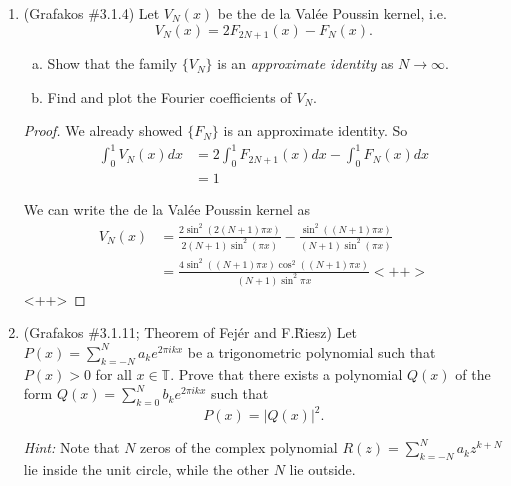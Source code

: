 \documentclass[a4paper]{article}
\begin{document}
\begin{enumerate}
\item  (Grafakos \#3.1.4) Let $V_N (x)$ be the de la Val\'{e}e Poussin   kernel, i.e. $$ V_N (x) = 2 F_{2N+1} (x) - F_N (x). $$

\begin{enumerate}[(a)]
\item Show that the family $\{ V_N \}$ is an {\it{approximate identity}} as $N\rightarrow \infty$.
\item Find and plot the Fourier coefficients of $V_N$.
\end{enumerate}

  \begin{proof}

    We already showed $\{F_N\}$ is an approximate identity. So
    \begin{align*}
      \int_{0}^{1} V_N(x) dx &= 2 \int_{0}^{1} F_{2N+1}(x) dx - \int_{0}^{1} F_N(x)dx \\
      &= 1
    \end{align*}

    We can write the de la Val\'{e}e Poussin kernel as
    \begin{align*}
      V_N(x) &= \frac{2 \sin^2(2(N+1) \pi x)}{2(N+1) \sin^2 (\pi x)} - \frac{\sin^2\left( (N+1) \pi x \right)}{(N+1) \sin^2 ( \pi x)} \\
      &= \frac{4 \sin^2 \left(  (N+1) \pi x \right) \cos^2 \left( (N+1) \pi x \right)}{(N+1) \sin^2 \pi x}<++>
    \end{align*}<++>

  \end{proof}

\item  (Grafakos \#3.1.11; Theorem of Fej\'er and F.\~Riesz)  Let $\displaystyle{ P(x) = \sum_{k=-N}^N a_k e^{2\pi i k x} }$ be a trigonometric polynomial such that $ P(x) > 0$ for all $x\in \mathbb T$. Prove that there exists a polynomial  $Q(x)$ of the form  $\displaystyle{ Q(x) = \sum_{k=0}^N b_k e^{2\pi i k x} }$ such that $$P (x) = | Q(x) |^2 . $$

{\it{Hint:}}  Note that $N$ zeros of the complex polynomial   $\displaystyle{ R(z) = \sum_{k=-N}^N a_k z^{k+N} }$ lie inside the unit circle, while the other $N$ lie outside.

\end{enumerate}
\end{document}
